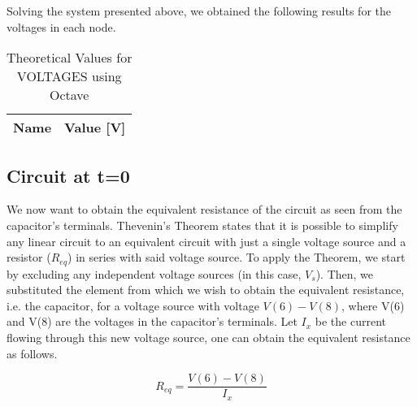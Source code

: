 Solving the system presented above, we obtained the following results for the voltages in each node.

\begin{table}[H]
  \centering
  \begin{tabular}{|l|r|}
    \hline
    {\bf Name} & {\bf Value [V]} \\ \hline
    
  \end{tabular}
  \caption{Theoretical Values for VOLTAGES using Octave}
  \label{tab:alinea1_voltagens_tab}
\end{table}

\subsection{Circuit at t=0}

We now want to obtain the equivalent resistance of the circuit as seen from the capacitor's terminals.
Thevenin’s Theorem states that it is possible to simplify any linear circuit to an equivalent circuit with just a single voltage source and a resistor ($R_{eq}$) in series with said voltage source.
To apply the Theorem, we start by excluding any independent voltage sources (in this case, $V_s$). Then, we substituted the element from which we wish to obtain the equivalent resistance, i.e. the capacitor, for a voltage source with voltage $V(6)-V(8)$, where V(6) and V(8) are the voltages in the capacitor's terminals. Let $I_x$ be the current flowing through this new voltage source, one can obtain the equivalent resistance as follows.

 \begin{center}
\begin{equation}
R_{eq}=\frac{V(6)-V(8)}{I_x}
\label{current law}
\end{equation}
\end{center}

